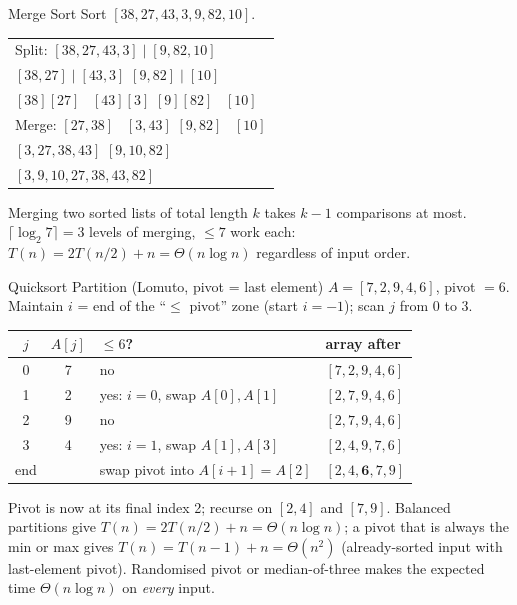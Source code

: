 \documentclass[11pt,a4paper]{article}
\begin{document}
\begin{worked}{Merge Sort}
Sort $[38, 27, 43, 3, 9, 82, 10]$.
\begin{center}
\small
\begin{tabular}{l}
Split: $[38, 27, 43, 3] \mid [9, 82, 10]$ \\
\quad $[38, 27] \mid [43, 3]$ \qquad $[9, 82] \mid [10]$ \\
\quad\quad $[38] [27]$ \ $[43] [3]$ \qquad $[9] [82]$ \ $[10]$ \\
Merge: $[27, 38]$ \ $[3, 43]$ \qquad $[9, 82]$ \ $[10]$ \\
\quad $[3, 27, 38, 43]$ \qquad $[9, 10, 82]$ \\
\quad $[3, 9, 10, 27, 38, 43, 82]$ \\
\end{tabular}
\end{center}
Merging two sorted lists of total length $k$ takes $k - 1$ comparisons at most. $\lceil\log_2 7\rceil = 3$ levels of merging, $\le 7$ work each: $T(n) = 2T(n/2) + n = \Theta(n \log n)$ regardless of input order.
\end{worked}

\begin{worked}{Quicksort Partition (Lomuto, pivot = last element)}
$A = [7, 2, 9, 4, 6]$, pivot $= 6$. Maintain $i$ = end of the ``$\le$ pivot'' zone (start $i = -1$); scan $j$ from 0 to 3.
\begin{center}
\begin{tabular}{c|c|l|l}
\toprule
$j$ & $A[j]$ & $\le 6$? & array after \\ \midrule
0 & 7 & no & $[7, 2, 9, 4, 6]$ \\
1 & 2 & yes: $i = 0$, swap $A[0], A[1]$ & $[2, 7, 9, 4, 6]$ \\
2 & 9 & no & $[2, 7, 9, 4, 6]$ \\
3 & 4 & yes: $i = 1$, swap $A[1], A[3]$ & $[2, 4, 9, 7, 6]$ \\
end & & swap pivot into $A[i+1] = A[2]$ & $[2, 4, \mathbf{6}, 7, 9]$ \\
\bottomrule
\end{tabular}
\end{center}
Pivot is now at its final index 2; recurse on $[2, 4]$ and $[7, 9]$. Balanced partitions give $T(n) = 2T(n/2) + n = \Theta(n\log n)$; a pivot that is always the min or max gives $T(n) = T(n-1) + n = \Theta(n^2)$ (already-sorted input with last-element pivot). Randomised pivot or median-of-three makes the expected time $\Theta(n\log n)$ on \emph{every} input.
\end{worked}
\end{document}

